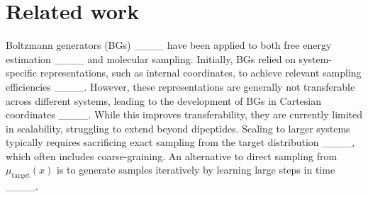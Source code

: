 \section{Related work}
\label{sec:related_work}
Boltzmann generators (BGs) ____ have been applied to both free energy estimation ____ and molecular sampling. Initially, BGs relied on system-specific representations, such as internal coordinates, to achieve relevant sampling efficiencies ____. However, these representations are generally not transferable across different systems, leading to the development of BGs in Cartesian coordinates ____. While this improves transferability, they are currently limited in scalability, struggling to extend beyond dipeptides. Scaling to larger systems typically requires sacrificing exact sampling from the target distribution  ____, which often includes coarse-graining. 
An alternative to direct sampling from $\mu_{\text{target}}(x)$ is to generate samples iteratively by learning large steps in time ____.